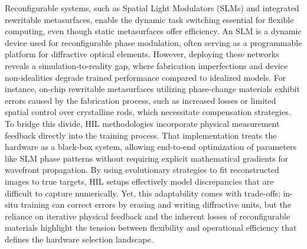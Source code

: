 Reconfigurable systems, such as Spatial Light Modulators (SLMs) and integrated rewritable metasurfaces, enable the dynamic task switching essential for flexible computing, even though static metasurfaces offer efficiency. \citep{doi_10_1002_adom_202300561_c4d7a5b0} \citep{doi_10_32446_0368_1025it_2023_12_35_39_fb1bb2c3} An SLM is a dynamic device used for reconfigurable phase modulation, often serving as a programmable platform for diffractive optical elements. However, deploying these networks reveals a simulation-to-reality gap, where fabrication imperfections and device non-idealities degrade trained performance compared to idealized models. For instance, on-chip rewritable metasurfaces utilizing phase-change materials exhibit errors caused by the fabrication process, such as increased losses or limited spatial control over crystalline rods, which necessitate compensation strategies. To bridge this divide, HIL methodologies incorporate physical measurement feedback directly into the training process. That implementation treats the hardware as a black-box system, allowing end-to-end optimization of parameters like SLM phase patterns without requiring explicit mathematical gradients for wavefront propagation. By using evolutionary strategies to fit reconstructed images to true targets, HIL setups effectively model discrepancies that are difficult to capture numerically. Yet, this adaptability comes with trade-offs; in-situ training can correct errors by erasing and writing diffractive units, but the reliance on iterative physical feedback and the inherent losses of reconfigurable materials highlight the tension between flexibility and operational efficiency that defines the hardware selection landscape. \citep{doi_10_1038_s41598_025_19638_8_1b2db1c9} \citep{doi_10_1364_oe_461549_b2d41b3f}

